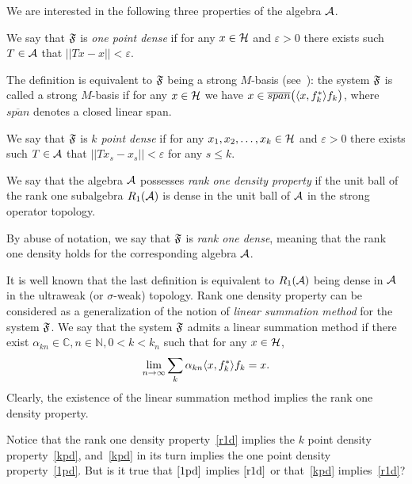 \documentclass[12pt,oneside,a4paper]{amsart}
\begin{document}
  We are interested in the following three properties of the algebra $\cal{A}$.
  \begin{definition}
    \label{1pd}
    We say that $\fsys$ is \emph{one point dense} if for any $x \in \cal{H}$ and $\varepsilon > 0$
      there exists such $T\in \cal{A}$ that $||Tx - x|| < \varepsilon$.

  \end{definition}
    The definition is equivalent to $\fsys$ being a strong $M$-basis (see~\cite{katavolos}):
    the system $\fsys$ is called a strong $M$-basis if for any $x\in\cal{H}$ we have $x \in \overline{span}\big(\inner{x}{f^*_k}f_k\big)$, where
      $\overline{span}$ denotes a closed linear span.
  \begin{definition}
    \label{kpd}
    We say that $\fsys$ is \emph{$k$ point dense} if for any $x_1, x_2, \dots, x_k \in \cal{H}$ and $\varepsilon > 0$
      there exists such $T\in \cal{A}$ that $||Tx_s - x_s|| < \varepsilon$ for any $s \leq k$.
  \end{definition}
  \begin{definition}
    \label{r1d}
    We say that the algebra $\cal{A}$ possesses \emph{rank one density property} if
      the unit ball of the rank one subalgebra $R_1(\cal{A})$ is dense in the unit ball of $\cal{A}$ in the strong operator topology.
  \end{definition}
  By abuse of notation, we say that $\fsys$ is \emph{rank one dense}, meaning that the rank one density holds for the corresponding algebra $\cal{A}$.

  It is well known that the last definition is equivalent to $R_1(\cal{A})$ being dense
    in $\cal{A}$ in the ultraweak (or $\sigma$-weak) topology.
  Rank one density property can be considered as a generalization of the notion of \emph{linear summation method} for the system $\fsys$.
  We say that the system $\fsys$ admits a linear summation method if there exist $\alpha_{kn} \in \mathbb{C}, n \in \mathbb{N}, 0 < k < k_n$
    such that for any $x \in \cal{H}$,
    \[
      \lim_{n \to \infty} \sum_k \alpha_{kn} \inner{x}{f^*_k}f_k = x.
    \]
  Clearly, the existence of the linear summation method implies the rank one density property.

  Notice that the rank one density property~\eqref{r1d} implies the $k$ point density property~\eqref{kpd}, and~\eqref{kpd}
    in its turn implies the one point density property~\eqref{1pd}.
  But is it true that $\eqref{1pd}$ implies $\eqref{r1d}$ or that~\eqref{kpd} implies~\eqref{r1d}?
\end{document}
